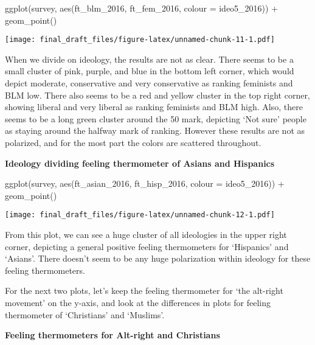 \documentclass[
]{article}
\newenvironment{Shaded}{\begin{snugshade}}{\end{snugshade}}
\newcommand{\AttributeTok}[1]{\textcolor[rgb]{0.77,0.63,0.00}{#1}}
\newcommand{\FunctionTok}[1]{\textcolor[rgb]{0.00,0.00,0.00}{#1}}
\newcommand{\NormalTok}[1]{#1}
\newcommand{\SpecialCharTok}[1]{\textcolor[rgb]{0.00,0.00,0.00}{#1}}
\begin{document}
\begin{Shaded}
\begin{Highlighting}[]
\FunctionTok{ggplot}\NormalTok{(survey, }\FunctionTok{aes}\NormalTok{(ft\_blm\_2016, ft\_fem\_2016, }\AttributeTok{colour =}\NormalTok{ ideo5\_2016)) }\SpecialCharTok{+} 
  \FunctionTok{geom\_point}\NormalTok{()}
\end{Highlighting}
\end{Shaded}

\texttt{[image: final\_draft\_files/figure-latex/unnamed-chunk-11-1.pdf]}

When we divide on ideology, the results are not as clear. There seems to
be a small cluster of pink, purple, and blue in the bottom left corner,
which would depict moderate, conservative and very conservative as
ranking feminists and BLM low. There also seems to be a red and yellow
cluster in the top right corner, showing liberal and very liberal as
ranking feminists and BLM high. Also, there seems to be a long green
cluster around the 50 mark, depicting `Not sure' people as staying
around the halfway mark of ranking. However these results are not as
polarized, and for the most part the colors are scattered throughout.

\textbf{Ideology dividing feeling thermometer of Asians and Hispanics}

\begin{Shaded}
\begin{Highlighting}[]
\FunctionTok{ggplot}\NormalTok{(survey, }\FunctionTok{aes}\NormalTok{(ft\_asian\_2016, ft\_hisp\_2016, }\AttributeTok{colour =}\NormalTok{ ideo5\_2016)) }\SpecialCharTok{+} 
  \FunctionTok{geom\_point}\NormalTok{()}
\end{Highlighting}
\end{Shaded}

\texttt{[image: final\_draft\_files/figure-latex/unnamed-chunk-12-1.pdf]}

From this plot, we can see a huge cluster of all ideologies in the upper
right corner, depicting a general positive feeling thermometers for
`Hispanics' and `Asians'. There doesn't seem to be any huge polarization
within ideology for these feeling thermometers.

For the next two plots, let's keep the feeling thermometer for `the
alt-right movement' on the y-axis, and look at the differences in plots
for feeling thermometer of `Christians' and `Muslims'.

\textbf{Feeling thermometers for Alt-right and Christians}
\end{document}
